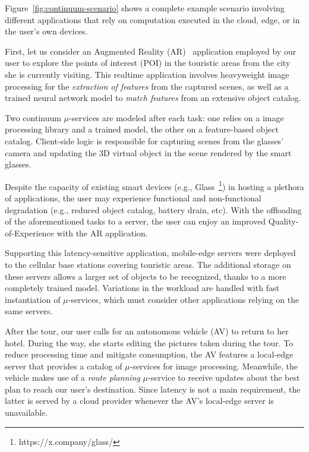 Figure~\ref{fig:continuum-scenario} shows a complete example scenario involving different applications that rely on computation executed in the cloud, edge, or in the user's own devices.

First, let us consider an Augmented Reality (AR)~\cite{GarrigaMendonca2017} application employed by our user to 
explore the points of interest (POI) in the touristic areas from the city she is currently visiting.
This realtime application involves heavyweight image processing for the \textit{extraction of features} from the captured scenes, as well as a trained neural network model to \textit{match features} from an extensive object catalog.

Two continuum $\mu$-services are modeled after each task: one relies on a image processing library and a trained model, the other on a feature-based object catalog. Client-side logic is responsible for capturing scenes from the glasses' camera and updating the 3D virtual object in the scene rendered by the smart glasses.

Despite the capacity of existing smart devices (e.g., Glass~\footnote{https://x.company/glass/}) in hosting a plethora of applications, the user may experience functional and non-functional degradation (e.g., reduced object catalog, battery drain, etc). With the offloading of the aforementioned tasks to a server, the user can enjoy an improved Quality-of-Experience with the AR application.


Supporting this latency-sensitive application, mobile-edge servers were deployed to the cellular base stations covering touristic areas. The additional storage on these servers allows a larger set of objects to be recognized, thanks to a more completely trained model. Variations in the workload are handled with fast instantiation of $\mu$-services, which must consider other applications relying on the same servers.


After the tour, our user calls for an autonomous vehicle (AV) to return to her hotel. During the way, she starts editing the pictures taken during the tour. To reduce processing time and mitigate consumption, the AV features a local-edge server that provides a catalog of $\mu$-services for image processing. Meanwhile, the vehicle makes use of a \textit{route planning} $\mu$-service
to receive updates about the best plan to reach our user's destination. Since latency is not a main requirement, the latter is served by a cloud provider whenever the AV's local-edge server is unavailable. 

